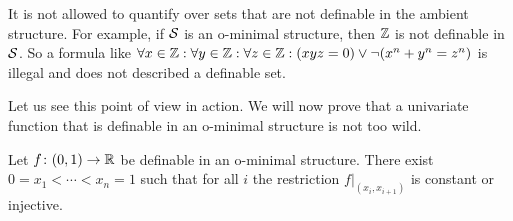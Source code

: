 \begin{warning}
  It is not allowed to quantify over sets that are not definable in
  the ambient structure. For example, if ${\mathcal S}$ is an o-minimal
  structure, then ${\mathbb{Z}}$ is not definable in ${\mathcal S}$. So a formula like
  $\forall x \in{\mathbb{Z}}:\forall y\in{\mathbb{Z}} :\forall z\in {\mathbb{Z}} :
  (xyz=0) \vee \neg(x^n+y^n=z^n)$ is illegal and does not described a
  definable set.
\end{warning}

Let us see this point of view in action. We will now prove that
a  univariate function that is definable in an o-minimal structure is
not too wild.

\begin{lemma}
  \label{lem:piecewisecnstinjective}
  Let $f\colon (0,1)\rightarrow{\mathbb{R}}$ be definable in an o-minimal
  structure. There exist $0=x_1<\cdots <x_n =1$
  such that for all $i$ the restriction  $f|_{(x_i,x_{i+1})}$
  is constant or injective. 
\end{lemma}

